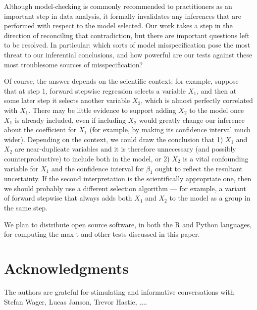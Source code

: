 \documentclass{article}
\begin{document}
Although model-checking is commonly recommended to practitioners as an important step in data analysis, it formally invalidates any inferences that are performed with respect to the model selected. Our work takes a step in the direction of reconciling that contradiction, but there are important questions left to be resolved. In particular: which sorts of model misspecification pose the most threat to our inferential conclusions, and how powerful are our tests against these most troublesome sources of misspecification? 

Of course, the answer depends on the scientific context: for example, suppose that at step 1, forward stepwise regression selects a variable $X_1$, and then at some later step it selects another variable $X_2$, which is almost perfectly correlated with $X_1$. There may be little evidence to support adding $X_2$ to the model once $X_1$ is already included, even if including $X_2$ would greatly change our inference about the coefficient for $X_1$ (for example, by making its confidence interval much wider). Depending on the context, we could draw the conclusion that 1) $X_1$ and $X_2$ are near-duplicate variables and it is therefore unnecessary (and possibly counterproductive) to include both in the model, or 2) $X_2$ is a vital confounding variable for $X_1$ and the confidence interval for $\beta_1$ ought to reflect the resultant uncertainty. If the second interpretation is the scientifically appropriate one, then we should probably use a different selection algorithm --- for example, a variant of forward stepwise that always adds both $X_1$ and $X_2$ to the model as a group in the same step.

We plan to distribute  open source software, in both the R and Python languages,  for computing the max-t and other tests discussed in this paper.




\section*{Acknowledgments}

The authors are grateful for stimulating and informative conversations with Stefan Wager, Lucas Janson, Trevor Hastie, ....



\end{document}
